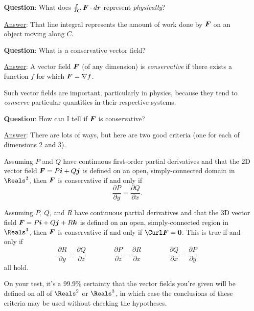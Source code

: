 \documentclass[12pt]{article}
\renewcommand{\Q}{\vspace{4.5mm}\noindent\textbf{Question}: }
\newcommand{\Ans}{\ul{Answer}: }
\begin{document}
	\Q What does $\oint_C\boldsymbol{F}\cdot d\boldsymbol{r}$ represent \textit{physically}?
	
	\Ans That line integral represents the amount of work done by $\boldsymbol{F}$ on an object moving along $C$.

	\Q What is a conservative vector field?
	
	\Ans A vector field $\boldsymbol{F}$ (of any dimension) is \textit{conservative} if there exists a function $f$ for which $\boldsymbol{F}=\nabla f$. 
	
	Such vector fields are important, particularly in physics, because they tend to \textit{conserve} particular quantities in their respective systems.
	
	\Q How can I tell if $\boldsymbol{F}$ is conservative?
	
	\Ans There are lots of ways, but here are two good criteria (one for each of dimensions 2 and 3).
	
	Assuming $P$ and $Q$ have continuous first-order partial derivatives and that the 2D vector field $\boldsymbol{F}=P\boldsymbol{i}+Q\boldsymbol{j}$ is defined on an open, simply-connected domain in $\Reals^2$, then $\boldsymbol{F}$ is conservative if and only if 
	$$\frac{\partial P}{\partial y} = \frac{\partial Q}{\partial x}.$$
	
	Assuming $P$, $Q$, and $R$ have continuous partial derivatives and that the 3D vector field $\boldsymbol{F}=P\boldsymbol{i}+Q\boldsymbol{j}+R\boldsymbol{k}$ is defined on an open, simply-connected region in $\Reals^3$, then $\boldsymbol{F}$ is conservative if and only if $\Curl\vect{F}=\vect{0}$. This is true if and only if
	$$\frac{\partial R}{\partial y} = \frac{\partial Q}{\partial z}\quad\quad\quad\quad\frac{\partial P}{\partial z} = \frac{\partial R}{\partial x}\quad\quad\quad\quad\frac{\partial Q}{\partial x} = \frac{\partial P}{\partial y}$$
	all hold.
	
	On your test, it's a 99.9\% certainty that the vector fields you're given will be defined on all of $\Reals^2$ or $\Reals^3$, in which case the conclusions of these criteria may be used without checking the hypotheses.
	
	
\end{document}
